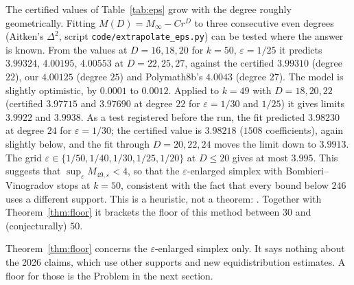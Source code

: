 \begin{remark}[heuristic: does the enlarged simplex stop at $k=50$?]\label{rem:k49}
The certified values of Table~\ref{tab:eps} grow with the degree roughly
geometrically. Fitting $M(D)=M_\infty-Cr^{D}$ to three consecutive even
degrees (Aitken's $\Delta^2$, script \texttt{code/extrapolate\_eps.py}) can
be tested where the answer is known. From the  values at $D=16,18,20$ for $k=50$,
$\varepsilon=1/25$ it predicts $3.99324$, $4.00195$, $4.00553$ at $D=22,25,27$,
against the certified $3.99310$ (degree $22$), our $4.00125$ (degree $25$)
and Polymath8b's $4.0043$ (degree $27$). The model is slightly optimistic, by
$0.0001$ to $0.0012$. Applied to $k=49$ with $D=18,20,22$ (certified
$3.97715$ and $3.97690$ at degree $22$ for $\varepsilon=1/30$ and $1/25$) it
gives limits $3.9922$ and $3.9938$. As a test registered before the run, the
fit predicted $3.98230$ at degree $24$ for $\varepsilon=1/30$; the certified
value is $3.98218$ ($1508$ coefficients), again slightly below, and the fit
through $D=20,22,24$ moves the limit down to $3.9913$. The grid
$\varepsilon\in\{1/50,1/40,1/30,1/25,1/20\}$ at $D\le20$ gives at most
$3.995$. This suggests that $\sup_\varepsilon M_{49,\varepsilon}<4$, so that
the $\varepsilon$-enlarged simplex with Bombieri--Vinogradov stops at $k=50$,
consistent with the fact that every bound below $246$ uses a different support.
This is a heuristic, not a theorem: . Together with
Theorem~\ref{thm:floor} it brackets the floor of this method between $30$ and
(conjecturally) $50$.
\end{remark}

\begin{remark}[scope]
Theorem~\ref{thm:floor} concerns the $\varepsilon$-enlarged simplex only. It
says nothing about the 2026 claims, which use other supports and new
equidistribution estimates. A floor for those is the Problem in the next
section.
\end{remark}

